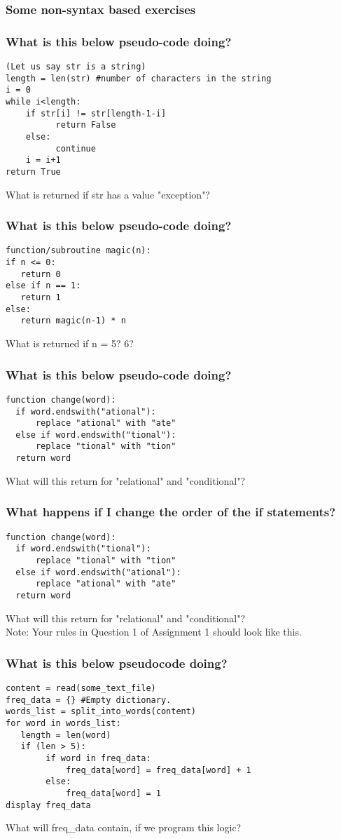 \documentclass{beamer}
\begin{document}
\begin{frame}
\frametitle{Some non-syntax based exercises}
\end{frame}

\begin{frame}[fragile]
\frametitle{What is this below pseudo-code doing?}
\begin{verbatim}
(Let us say str is a string)
length = len(str) #number of characters in the string
i = 0
while i<length:
    if str[i] != str[length-1-i]
          return False
    else:
          continue
    i = i+1
return True
\end{verbatim}
\pause What is returned if str has a value "exception"? 
\end{frame}


\begin{frame}[fragile]
\frametitle{What is this below pseudo-code doing?}
\begin{verbatim}
function/subroutine magic(n):
if n <= 0:
   return 0
else if n == 1:
   return 1
else:
   return magic(n-1) * n
\end{verbatim}	
\pause What is returned if n = 5? 6? 
\end{frame}

\begin{frame}[fragile]
\frametitle{What is this below pseudo-code doing?}
\begin{verbatim}
function change(word):
  if word.endswith("ational"):
      replace "ational" with "ate"
  else if word.endswith("tional"):
      replace "tional" with "tion"
  return word
\end{verbatim}
\pause What will this return for "relational" and "conditional"?
\end{frame}

\begin{frame}[fragile]
\frametitle{What happens if I change the order of the if statements?}
\begin{verbatim}
function change(word):
  if word.endswith("tional"):
      replace "tional" with "tion"
  else if word.endswith("ational"):
      replace "ational" with "ate"
  return word
\end{verbatim}
\pause What will this return for "relational" and "conditional"?
\\ Note: Your rules in Question 1 of Assignment 1 should look like this.
\end{frame}

\begin{frame}[fragile]
\frametitle{What is this below pseudocode doing?}
\begin{verbatim}
content = read(some_text_file)
freq_data = {} #Empty dictionary. 
words_list = split_into_words(content)
for word in words_list:
   length = len(word)
   if (len > 5):
        if word in freq_data:
            freq_data[word] = freq_data[word] + 1
        else:
            freq_data[word] = 1
display freq_data
\end{verbatim}
What will freq\_data contain, if we program this logic? 
\end{frame}
\end{document}
